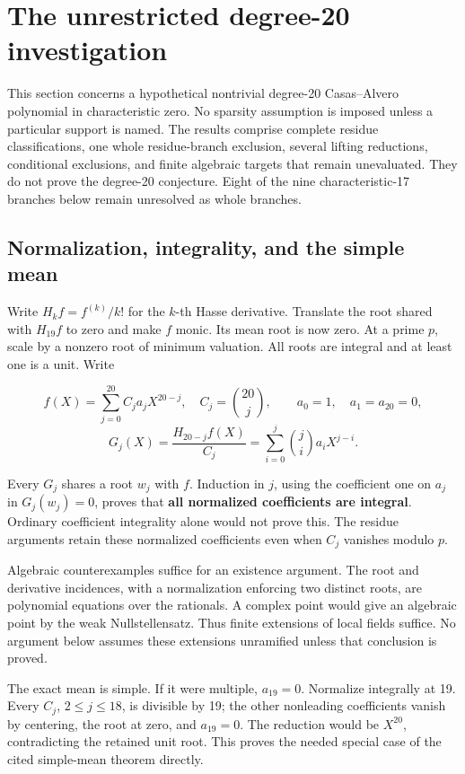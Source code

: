 \documentclass[
  british,
  10pt,
]{article}
\begin{document}
\section{The unrestricted degree-20
investigation}\label{the-unrestricted-degree-20-investigation}

This section concerns a hypothetical nontrivial degree-20 Casas--Alvero
polynomial in characteristic zero. No sparsity assumption is imposed
unless a particular support is named. The results comprise complete
residue classifications, one whole residue-branch exclusion, several
lifting reductions, conditional exclusions, and finite algebraic targets
that remain unevaluated. They do not prove the degree-20 conjecture.
Eight of the nine characteristic-17 branches below remain unresolved as
whole branches.

\subsection{Normalization, integrality, and the simple
mean}\label{normalization-integrality-and-the-simple-mean}

Write \(H_kf=f^{(k)}/k!\) for the \(k\)-th Hasse derivative. Translate
the root shared with \(H_{19}f\) to zero and make \(f\) monic. Its mean
root is now zero. At a prime \(p\), scale by a nonzero root of minimum
valuation. All roots are integral and at least one is a unit. Write

\[
 f(X)=\sum_{j=0}^{20}C_ja_jX^{20-j},\quad C_j=\binom{20}{j},
 \qquad a_0=1,\quad a_1=a_{20}=0,
\] \[
 G_j(X)=\frac{H_{20-j}f(X)}{C_j}
       =\sum_{i=0}^{j}\binom ji a_iX^{j-i}.                 \tag{D1}
\]

Every \(G_j\) shares a root \(w_j\) with \(f\). Induction in \(j\),
using the coefficient one on \(a_j\) in \(G_j(w_j)=0\), proves that
\textbf{all normalized coefficients are integral}. Ordinary coefficient
integrality alone would not prove this. The residue arguments retain
these normalized coefficients even when \(C_j\) vanishes modulo \(p\).

Algebraic counterexamples suffice for an existence argument. The root
and derivative incidences, with a normalization enforcing two distinct
roots, are polynomial equations over the rationals. A complex point
would give an algebraic point by the weak Nullstellensatz. Thus finite
extensions of local fields suffice. No argument below assumes these
extensions unramified unless that conclusion is proved.

The exact mean is simple. If it were multiple, \(a_{19}=0\). Normalize
integrally at 19. Every \(C_j\), \(2\le j\le18\), is divisible by 19;
the other nonleading coefficients vanish by centering, the root at zero,
and \(a_{19}=0\). The reduction would be \(X^{20}\), contradicting the
retained unit root. This proves the needed special case of the cited
simple-mean theorem directly.
\end{document}
